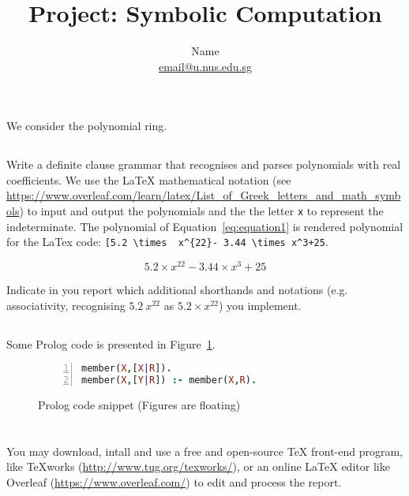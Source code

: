 \documentclass[10pt,a4paper]{article}
\title{Project: Symbolic Computation}
\author{Name \\ \url{email@u.nus.edu.sg}}
\begin{document}
\maketitle

	
\section{}
We consider the polynomial ring.

\subsection{}
Write a definite clause grammar that  recognises and parses polynomials with real coefficients. We use the LaTeX mathematical notation (see \url{https://www.overleaf.com/learn/latex/List_of_Greek_letters_and_math_symbols}) to input and output the polynomials and the the letter \verb+x+ to represent the indeterminate. The polynomial of Equation~\ref{eq:equation1} is rendered polynomial for the LaTex code: \verb&[5.2 \times  x^{22}- 3.44 \times x^3+25&.

\begin{equation} 
\label{eq:equation1}
5.2 \times  x^{22}- 3.44 \times x^3+25
\end{equation}



Indicate in you report which additional shorthands and notations (e.g. associativity, recognising $5.2 \  x^{22}$ as $5.2   \times x^{22}$) you implement.
\subsection{}
 Some Prolog code is presented in Figure~\ref{fig:code1}.


\begin{figure}

\begin{lstlisting}[language=Prolog,frame = single,basicstyle=\footnotesize,numbers=left,stepnumber=1]
% member/2
member(X,[X|R]).
member(X,[Y|R]) :- member(X,R).
\end{lstlisting}
\caption{Prolog code snippet (Figures are floating)}
\label{fig:code1}
\end{figure}
\section{} You may download, intall and use a free and open-source TeX front-end program, like TeXworks (\url{http://www.tug.org/texworks/}), or an online LaTeX editor like Overleaf (\url{https://www.overleaf.com/}) to edit and process the report.
\end{document}
